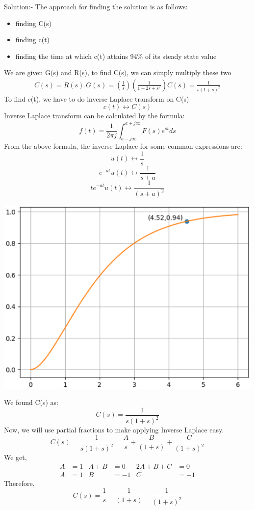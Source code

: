 \documentclass[journal,12pt,twocolumn]{IEEEtran}
\renewcommand\thesection{\arabic{section}}
\begin{document}
\begin{enumerate}[label=\arabic*.,ref=\thesection.\theenumi]
{Solution:- }
The approach for finding the solution is as follows:
\begin{itemize}
    \item finding C(s)
    \item finding c(t)
    \item finding the time at which c(t) attains 94\% of its steady state value
\end{itemize}

We are given G(s) and R(s), to find C(s), we can simply multiply these two
\begin{align}
C(s) = R(s).G(s) = (\frac{1}{s})  (\frac{1}{1+2s+s^2})
C(s) =  \frac{1}{s(1+s)^2}
\end{align}
To find c(t), we have to do inverse Laplace transform on C(s)
$$c(t) \longleftrightarrow C(s)$$
Inverse Laplace transform can be calculated by the formula:
$$f(t) = \frac{1}{2\pi j} \int_{a -j\infty}^{a+j\infty}F(s)e^{st} ds$$
From the above formula, the inverse Laplace for some common expressions are:
$$u(t) \longleftrightarrow \frac{1}{s}$$
$$e^{-at} u(t) \longleftrightarrow \frac{1}{s+a}$$
$$t e^{-at} u(t) \longleftrightarrow \frac{1}{(s+a)^2}$$

\includegraphics[scale=0.5]{./figs/plot.eps}

We found C(s) as:
$$C(s) =  \frac{1}{s(1+s)^2}$$
Now, we will use partial fractions to make applying Inverse Laplace easy.
$$C(s) =  \frac{1}{s(1+s)^2} =  \frac{A}{s} + \frac{B}{(1+s)} + \frac{C}{(1+s)^2}$$
We get, 
\begin{align*}
A &= 1 & A+B &=0 & 2A+B+C &= 0 \\
A &=1 & B &=-1 & C &=-1
\end{align*}
Therefore,
$$C(s) = \frac{1}{s} - \frac{1}{(1+s)} - \frac{1}{(1+s)^2}$$


\end{enumerate}
\end{document}
